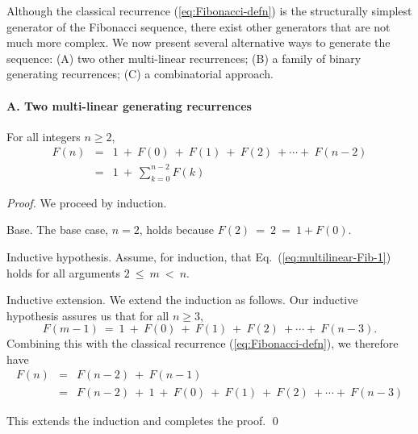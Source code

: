 Although the classical recurrence (\ref{eq:Fibonacci-defn}) is the structurally simplest generator of the Fibonacci sequence, there exist other generators that are not much more complex.  We now present several alternative ways to generate the sequence: (A) two other multi-linear recurrences; (B) a family of binary generating recurrences; (C) a combinatorial approach.

\paragraph{A. Two multi-linear generating recurrences}


\begin{prop}
\label{thm:FiboSum-1}
For all integers $n \geq 2$,
\begin{eqnarray}
\label{eq:multilinear-Fib-1}
F(n) & = &
1 \ + \ F(0) \ + \ F(1) \ + \ F(2) \ + \cdots + \ F(n-2) \\
\nonumber
     & = &
1 \ + \ \sum_{k=0}^{n-2} F(k)
\end{eqnarray}
\end{prop}

\begin{proof}
We proceed by induction.

\smallskip

\noindent
{\sf Base}. The base case, $n=2$, holds because $F(2) \ = \ 2 \ = \ 1 + F(0)$.

\smallskip

\noindent 
{\sf Inductive hypothesis}.
Assume, for induction, that Eq.~(\ref{eq:multilinear-Fib-1}) holds for all arguments $2 \ \leq \ m  \ < \ n$.

\smallskip

\noindent 
{\sf Inductive extension}.
We extend the induction as follows.  Our inductive hypothesis assures us that for all $n \geq 3$,
\[ F(m-1) \ = \ 1 \ + \ F(0) \ + \ F(1) \ + \ F(2) \ + \cdots + \ F(n-3). \]
Combining this with the classical recurrence (\ref{eq:Fibonacci-defn}), we therefore have
\begin{eqnarray*}
F(n) & = & F(n-2) \ + \ F(n-1) \\
     & = &
F(n-2) \ + \ 1 \ + \ F(0) \ + \ F(1) \ + \ F(2) \ + \cdots + \ F(n-3)
\end{eqnarray*}

\noindent
This extends the induction and completes the proof.
\qed
\end{proof}

